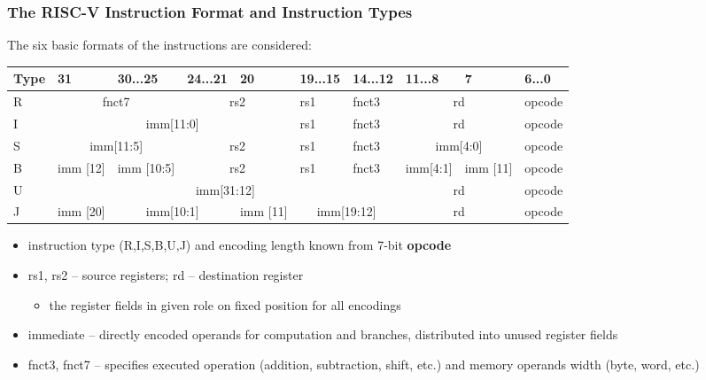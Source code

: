 \documentclass[aspectratio=169]{beamer}
\begin{document}
\begin{frame}
\frametitle{The RISC-V Instruction Format and Instruction Types}

The six basic formats of the instructions are considered:
\begin{table}
\footnotesize
\begin{tabular}{|m{0.45cm}|m{1.3cm}|m{1.6cm}|m{1.0cm}|m{1.2cm}|m{1.0cm}|m{1.0cm}|m{1.0cm}|m{1.2cm}|m{1.0cm}|}\hline
Type & 31 & 30...25 & 24...21 & 20 & 19...15 & 14...12 & 11...8 & 7 & 6...0 \\ \hline
R & \multicolumn{2}{c|}{ fnct7 } & \multicolumn{2}{c|}{ rs2 } & rs1 & fnct3 &\multicolumn{2}{c|}{ rd } & opcode\\ \hline
I & \multicolumn{4}{c|}{ imm[11:0] } & rs1 & fnct3 &\multicolumn{2}{c|}{ rd } & opcode\\ \hline
S & \multicolumn{2}{c|}{ imm[11:5] } & \multicolumn{2}{c|}{ rs2 } & rs1 & fnct3 &\multicolumn{2}{c|}{ imm[4:0] } & opcode\\ \hline
B & imm [12] & imm [10:5]  & \multicolumn{2}{c|}{ rs2 } & rs1 & fnct3 & imm[4:1]& imm [11] & opcode\\ \hline
U & \multicolumn{6}{c|}{ imm[31:12] }  & \multicolumn{2}{c|}{ rd } & opcode\\ \hline
J & imm [20] & \multicolumn{2}{c|}{ imm[10:1] } & imm [11] & \multicolumn{2}{c|}{ imm[19:12] } & \multicolumn{2}{c|}{ rd } & opcode\\ \hline
\end{tabular}
\end{table}

\begin{itemize}
\item instruction type (R,I,S,B,U,J) and encoding length known from 7-bit \textbf{opcode}
\item rs1, rs2 -- source registers; rd -- destination register
\begin{itemize}
\item the register fields in given role on fixed position for all encodings
\end{itemize}
\item immediate -- directly encoded operands for computation and branches, distributed into unused register fields
\item fnct3, fnct7 -- specifies executed operation (addition, subtraction, shift, etc.) and memory operands width (byte, word, etc.)
\end{itemize}

\end{frame}
\end{document}
